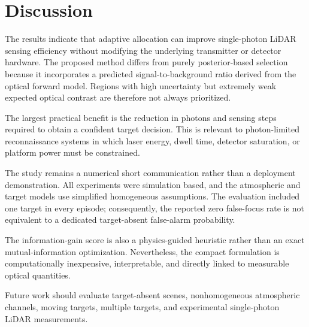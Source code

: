 \section{Discussion}

The results indicate that adaptive allocation can improve single-photon LiDAR sensing efficiency without modifying the underlying transmitter or detector hardware. The proposed method differs from purely posterior-based selection because it incorporates a predicted signal-to-background ratio derived from the optical forward model. Regions with high uncertainty but extremely weak expected optical contrast are therefore not always prioritized.

The largest practical benefit is the reduction in photons and sensing steps required to obtain a confident target decision. This is relevant to photon-limited reconnaissance systems in which laser energy, dwell time, detector saturation, or platform power must be constrained.

The study remains a numerical short communication rather than a deployment demonstration. All experiments were simulation based, and the atmospheric and target models use simplified homogeneous assumptions. The evaluation included one target in every episode; consequently, the reported zero false-focus rate is not equivalent to a dedicated target-absent false-alarm probability.

The information-gain score is also a physics-guided heuristic rather than an exact mutual-information optimization. Nevertheless, the compact formulation is computationally inexpensive, interpretable, and directly linked to measurable optical quantities.

Future work should evaluate target-absent scenes, nonhomogeneous atmospheric channels, moving targets, multiple targets, and experimental single-photon LiDAR measurements.

